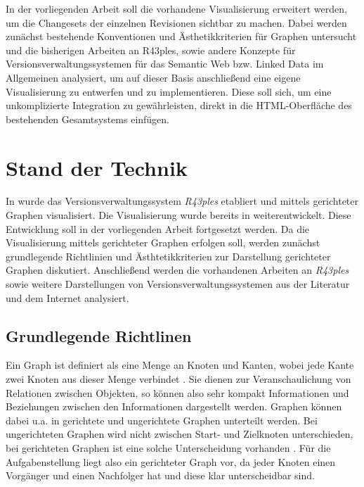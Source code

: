 \documentclass[nocolor]{tudbook}
\begin{document}
In der vorliegenden Arbeit soll die vorhandene Visualisierung erweitert werden, um die Changesets der einzelnen Revisionen sichtbar zu machen. Dabei werden zunächst bestehende Konventionen und Ästhetikkriterien für Graphen untersucht und die bisherigen Arbeiten an R43ples, sowie andere Konzepte für Versionsverwaltungssystemen für das Semantic Web bzw. Linked Data im Allgemeinen analysiert, um auf dieser Basis anschließend eine eigene Visualisierung zu entwerfen und zu implementieren. Diese soll sich, um eine unkomplizierte Integration zu gewährleisten, direkt in die HTML-Oberfläche des bestehenden Gesamtsystems einfügen.

\chapter{Stand der Technik}
In \cite{Graube} wurde das Versionsverwaltungssystem \textit{R43ples} etabliert und mittels gerichteter Graphen visualisiert. Die Visualisierung wurde bereits in \cite{Gruppe2.3,Gruppe2.1} weiterentwickelt. Diese Entwicklung soll in der vorliegenden Arbeit fortgesetzt werden. Da die Visualisierung mittels gerichteter Graphen erfolgen soll, werden zunächst grundlegende Richtlinien und Ästhtetikkriterien zur Darstellung gerichteter Graphen diskutiert. Anschließend werden die vorhandenen Arbeiten an \textit{R43ples} sowie weitere Darstellungen von Versionsverwaltungssystemen aus der Literatur und dem Internet analysiert.

\section{Grundlegende Richtlinen}
\label{sec:Richtlinien}
Ein Graph ist definiert als eine Menge an Knoten und Kanten, wobei jede Kante zwei Knoten aus dieser Menge verbindet \cite[Seite 2]{Graphenoptimierung}. Sie dienen zur Veranschaulichung von Relationen zwischen Objekten, so können also sehr kompakt Informationen und Beziehungen zwischen den Informationen dargestellt werden. Graphen können dabei u.a. in gerichtete und ungerichtete Graphen unterteilt werden. Bei ungerichteten Graphen wird nicht zwischen Start- und Zielknoten unterschieden, bei gerichteten Graphen ist eine solche Unterscheidung vorhanden \cite{diskreteMathematik}. Für die Aufgabenstellung liegt also ein gerichteter Graph vor, da jeder Knoten einen Vorgänger und einen Nachfolger hat und diese klar unterscheidbar sind.
\end{document}
